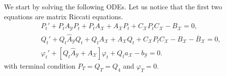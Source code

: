 \documentclass[11pt,twoside]{amsart}
\theoremstyle{definition}
\numberwithin{equation}{section}
\renewcommand{\hat}{\widehat}
\begin{document}
We start by solving the following ODEs. Let us notice that the first two equations are matrix Riccati equations.
\begin{align}
    &\label{eqn: P} {P}_t' +{P}_t A_{\mathcal{Y}} {P}_t + {P}_t A_{\mathcal{X}}  + A_{\mathcal{X}} {P}_t  + C_{\mathcal{X}} {P}_t C_{\mathcal{X}} - B_{\mathcal{X}} = 0,
    \\
    & {Q}_t' + Q_t \hat{A}_{\mathcal{Y}} Q_t + Q_t A_{\mathcal{X}} +   A_{\mathcal{X}} Q_t + C_{\mathcal{X}} {P}_t C_{\mathcal{X}} - B_{\mathcal{X}} - \overline{B}_{\mathcal{X}}   = 0,
    \\
    &\label{eqn: odevarphi} {\varphi}_t'  + [Q_t \hat{A}_{\mathcal{Y}} + A_{\mathcal{X}}]\varphi_t + Q_t a_\mathcal{X} - b_\mathcal{Y} =0.
\end{align}
with terminal condition $P_T=Q_T=Q_4$ and $\varphi_T=0$.
\end{document}
